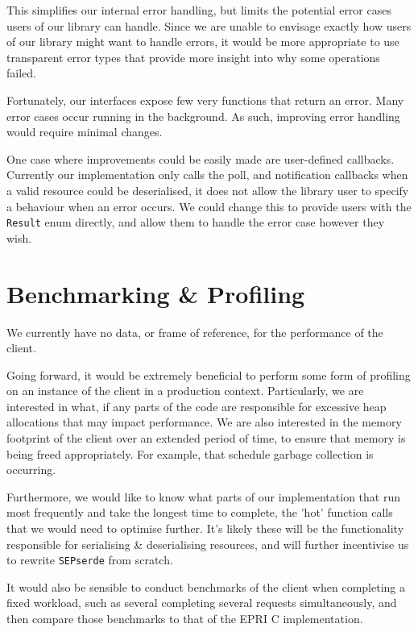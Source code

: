 This simplifies our internal error handling, but limits the potential error cases users of our library can handle. Since we are unable to envisage exactly how users of our library might want to handle errors, it would be more appropriate to use transparent error types that provide more insight into why some operations failed.

Fortunately, our interfaces expose few very functions that return an error. Many error cases occur running in the background. As such, improving error handling would require minimal changes.

One case where improvements could be easily made are user-defined callbacks. Currently our implementation only calls the poll, and notification callbacks when a valid resource could be deserialised, it does not allow the library user to specify a behaviour when an error occurs. We could change this to provide users with the \texttt{Result} enum directly, and allow them to handle the error case however they wish.   

\section{Benchmarking \& Profiling}
We currently have no data, or frame of reference, for the performance of the client. 

Going forward, it would be extremely beneficial to perform some form of profiling on an instance of the client in a production context. Particularly, we are interested in what, if any parts of the code are responsible for excessive heap allocations that may impact performance.
We are also interested in the memory footprint of the client over an extended period of time, to ensure that memory is being freed appropriately. For example, that schedule garbage collection is occurring. 

Furthermore, we would like to know what parts of our implementation that run most frequently and take the longest time to complete, the 'hot' function calls that we would need to optimise further. It's likely these will be the functionality responsible for serialising \& deserialising resources, and will further incentivise us to rewrite \texttt{SEPserde} from scratch.

It would also be sensible to conduct benchmarks of the client when completing a fixed workload, such as several completing several requests simultaneously, and then compare those benchmarks to that of the EPRI C implementation.






